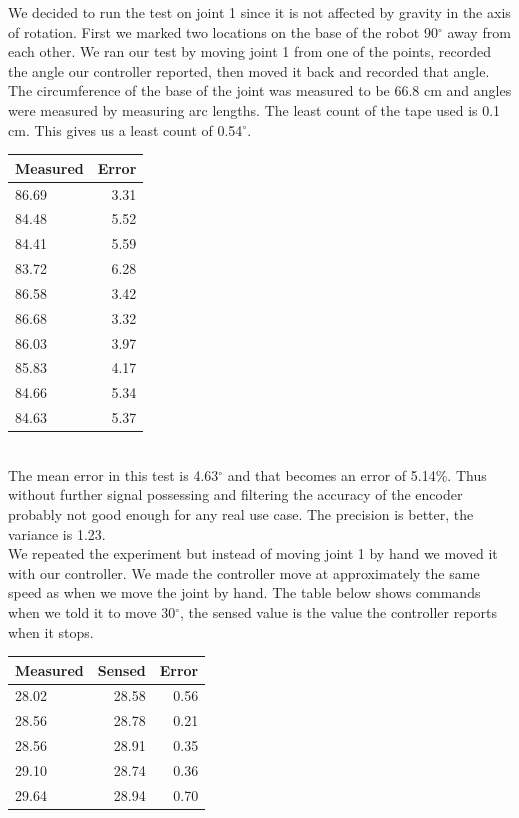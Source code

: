 \documentclass[10pt,a4paper]{article}
\begin{document}
We decided to run the test on joint 1 since it is not affected by gravity in the axis of rotation. First we marked two locations on the base of the robot 90$ ^{\circ} $ away from each other.  We ran our test by moving joint 1 from one of the points, recorded the angle our controller reported, then moved it back and recorded that angle. The circumference of the base of the joint was measured to be 66.8 cm and angles were measured by measuring arc lengths. The least count of the tape used is 0.1 cm. This gives us a least count of 0.54$ ^{\circ} $.\\

\begin{tabular}{ | l | r |}
\hline
\textbf{Measured} & \textbf{Error} \\
\hline
 86.69 & 3.31 \\
\hline
 84.48 & 5.52 \\
\hline
 84.41 & 5.59 \\
\hline
 83.72 & 6.28 \\
\hline
 86.58 & 3.42\\
\hline
 86.68 & 3.32\\
\hline
86.03 & 3.97\\
\hline
85.83 & 4.17\\
\hline
84.66 & 5.34\\
\hline
84.63 & 5.37\\
\hline
\end{tabular} \\ 

The mean error in this test is 4.63$ ^{\circ} $ and that becomes an error of 5.14\%. Thus without further signal possessing and filtering the accuracy of the encoder probably not good enough for any real use case. The precision is better, the variance is 1.23.\\

We repeated the experiment but instead of moving joint 1 by hand we moved it with our controller. We made the controller move at approximately the same speed as when we move the joint by hand. The table below shows commands when we told it to move 30$ ^{\circ} $, the sensed value is the value the controller reports when it stops. \\

\begin{tabular}{ | l | r | r |}
\hline
\textbf{Measured} & \textbf{Sensed} & \textbf{Error} \\
\hline
 28.02 & 28.58 & 0.56  \\
\hline
 28.56	& 28.78 & 0.21 \\
\hline
 28.56 & 28.91 & 0.35 \\
\hline
 29.10 & 28.74 & 0.36 \\
\hline
 29.64 & 28.94 & 0.70\\
\hline
\end{tabular} \\
\end{document}
